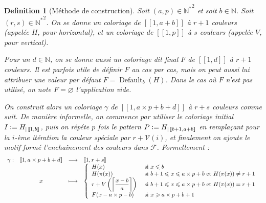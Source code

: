 \documentclass{article}
\newtheorem{definition}{Definition}[section]
\DeclareMathOperator{\coldef}{Default}
\newcommand{\defeq}{\vcentcolon=}
\begin{document}
\begin{definition}[Méthode de construction]
Soit \((a, p) \in {\mathbb{N}^*}^2\) et soit \(b \in \mathbb{N}\). Soit \((r, s) \in {\mathbb{N}^*}^2\). On se donne un coloriage de \([\![1, a + b]\!]\) à \(r + 1\) couleurs (appelée \(H\), pour horizontal), et un coloriage de \([\![1, p]\!]\) à \(s\) couleurs (appelée \(V\), pour vertical).

Pour un \(d \in \mathbb{N}\), on se donne aussi un coloriage dit final \(F\) de \([\![1, d]\!]\) à \(r + 1\) couleurs. Il est parfois utile de définir \(F\) au cas par cas, mais on peut aussi lui attribuer une valeur par défaut \(F = \coldef_b(H)\). Dans le cas où \(F\) n'est pas utilisé, on note \(F = \varnothing\) l'application vide. 

On construit alors un coloriage \(\gamma\) de \([\![1, a \times p + b + d]\!]\) à \(r + s\) couleurs comme suit. De manière informelle, on commence par utiliser le coloriage initial \(I \defeq H_{| \, [\![1, b]\!]}\), puis on répéte \(p\) fois le pattern \(P \defeq H_{| \, [\![b + 1, a + b]\!]}\) en remplaçant pour la \(i\)-ème itération la couleur spéciale par \(r + \mathcal{V}(i)\), et finalement on ajoute le motif formé l'enchaînement des couleurs dans \(\mathcal{F}\). Formellement :
\[\begin{array}{c c c l}
	\gamma: & [\![1, a \times p + b + d]\!]  & \longrightarrow &  [\![1, r + s]\!] \\
 	& x & \longmapsto & 
		\left\{\begin{array}{l l}
			H(x) & ~\text{si}~ x \leqslant b \\
			H(\pi(x)) & ~\text{si}~  b + 1 \leqslant x \leqslant a \times p + b ~\text{et}~ H(\pi(x)) \neq r + 1 \\
			r + V \left(\left\lceil \dfrac{x - b}{a} \right\rceil\right) & ~\text{si}~ b + 1 \leqslant x \leqslant a \times p + b ~\text{et}~ H(\pi(x)) = r + 1 \\
			F(x - a \times p - b) & ~\text{si}~ x \geqslant a \times p + b + 1
		\end{array}\right.
\end{array}\]
\end{definition}
\end{document}
